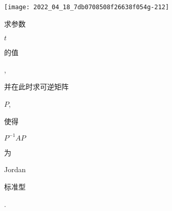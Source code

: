\documentclass[10pt]{article}
\begin{document}
\texttt{[image: 2022\_04\_18\_7db0708508f26638f054g-212]}

\begin{CJK}{UTF8}{mj}求参数\end{CJK} $t$ \begin{CJK}{UTF8}{mj}的值\end{CJK}, \begin{CJK}{UTF8}{mj}并在此时求可逆矩阵\end{CJK} $P$, \begin{CJK}{UTF8}{mj}使得\end{CJK} $P^{-1} A P$ \begin{CJK}{UTF8}{mj}为\end{CJK} Jordan \begin{CJK}{UTF8}{mj}标准型\end{CJK}.
\end{document}
